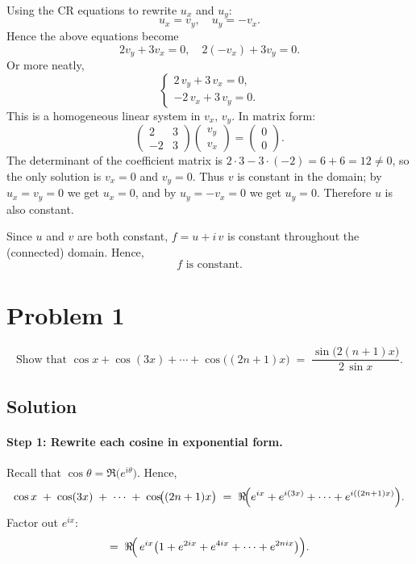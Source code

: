 \documentclass[12pt]{article}
\theoremstyle{definition} %
\theoremstyle{plain} %
\begin{document}
      Using the CR equations to rewrite $u_x$ and $u_y$:
      \[
      u_x = v_y, 
      \quad 
      u_y = -v_x.
      \]
      Hence the above equations become
      \[
      2v_y + 3v_x = 0,
      \quad
      2(-v_x) + 3v_y = 0.
      \]
      Or more neatly,
      \[
      \begin{cases}
      2\,v_y + 3\,v_x = 0,\\
      -2\,v_x + 3\,v_y = 0.
      \end{cases}
      \]
      This is a homogeneous linear system in $v_x,\,v_y$.  In matrix form:
      \[
      \begin{pmatrix}2 & 3\\[4pt]-2 & 3\end{pmatrix}
      \begin{pmatrix}v_y\\[2pt]v_x\end{pmatrix}
      = \begin{pmatrix}0\\0\end{pmatrix}.
      \]
      The determinant of the coefficient matrix is $2\cdot 3 - 3\cdot(-2) = 6+6=12\neq0$, so the only solution is $v_x=0$ and $v_y=0$.  Thus $v$ is constant in the domain; by $u_x=v_y=0$ we get $u_x=0$, and by $u_y=-v_x=0$ we get $u_y=0$.  Therefore $u$ is also constant.
      
      Since $u$ and $v$ are both constant, $f = u + i\,v$ is constant throughout the (connected) domain.  Hence,
      \[
      \boxed{f \text{ is constant.}}
      \]

      \section*{Problem 1}
\[
\text{Show that } \cos x + \cos(3x) + \cdots + \cos\!\bigl((2n+1)x\bigr)
\;=\;
\frac{\sin\!\bigl(2(n+1)x\bigr)}{2\,\sin x}.
\]

\subsection*{Solution}

\paragraph{Step 1: Rewrite each cosine in exponential form.}
Recall that $\cos \theta = \Re\!\bigl(e^{i\theta}\bigr)$.  Hence,
\[
\cos x \;+\; \cos(3x) \;+\;\cdots\;+\; \cos\!\bigl((2n+1)x\bigr)
\;=\;
\Re\!\Bigl(e^{i x} + e^{i (3x)} + \cdots + e^{i((2n+1)x)}\Bigr).
\]
Factor out $e^{i x}$:
\[
=\;
\Re\!\Bigl(\,e^{i x} \bigl(1 + e^{2i x} + e^{4 i x} + \cdots + e^{2n i x}\bigr)\Bigr).
\]
\end{document}
